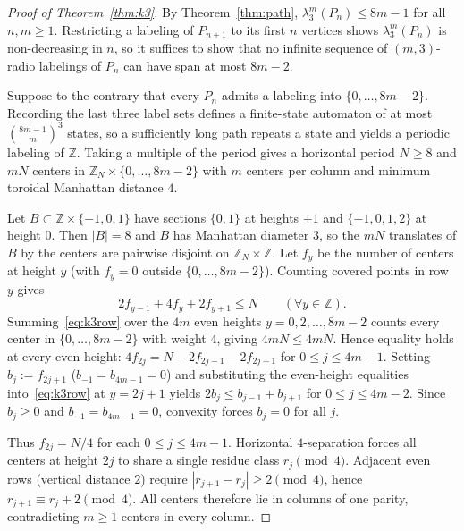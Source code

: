 \documentclass[11pt]{article}
\begin{document}
\begin{proof}[Proof of Theorem~\ref{thm:k3}]
By Theorem~\ref{thm:path}, $\lambda_3^m(P_n) \le 8m - 1$ for all $n, m \ge 1$. Restricting a labeling of $P_{n+1}$ to its first $n$ vertices shows $\lambda_3^m(P_n)$ is non-decreasing in $n$, so it suffices to show that no infinite sequence of $(m, 3)$-radio labelings of $P_n$ can have span at most $8m - 2$.

Suppose to the contrary that every $P_n$ admits a labeling into $\{0, \dots, 8m - 2\}$. Recording the last three label sets defines a finite-state automaton of at most $\binom{8m-1}{m}^3$ states, so a sufficiently long path repeats a state and yields a periodic labeling of $\mathbb{Z}$. Taking a multiple of the period gives a horizontal period $N \ge 8$ and $mN$ centers in $\mathbb{Z}_N \times \{0, \dots, 8m - 2\}$ with $m$ centers per column and minimum toroidal Manhattan distance $4$.

Let $B \subset \mathbb{Z} \times \{-1, 0, 1\}$ have sections $\{0, 1\}$ at heights $\pm 1$ and $\{-1, 0, 1, 2\}$ at height $0$. Then $|B| = 8$ and $B$ has Manhattan diameter $3$, so the $mN$ translates of $B$ by the centers are pairwise disjoint on $\mathbb{Z}_N \times \mathbb{Z}$. Let $f_y$ be the number of centers at height $y$ (with $f_y = 0$ outside $\{0, \dots, 8m - 2\}$). Counting covered points in row $y$ gives
\begin{equation}\label{eq:k3row}
2f_{y-1} + 4f_y + 2f_{y+1} \le N \qquad (\forall y \in \mathbb{Z}).
\end{equation}
Summing~\eqref{eq:k3row} over the $4m$ even heights $y = 0, 2, \dots, 8m - 2$ counts every center in $\{0, \dots, 8m - 2\}$ with weight $4$, giving $4mN \le 4mN$. Hence equality holds at every even height: $4f_{2j} = N - 2f_{2j-1} - 2f_{2j+1}$ for $0 \le j \le 4m - 1$. Setting $b_j := f_{2j+1}$ ($b_{-1} = b_{4m-1} = 0$) and substituting the even-height equalities into~\eqref{eq:k3row} at $y = 2j + 1$ yields $2b_j \le b_{j-1} + b_{j+1}$ for $0 \le j \le 4m - 2$. Since $b_j \ge 0$ and $b_{-1} = b_{4m-1} = 0$, convexity forces $b_j = 0$ for all $j$.

Thus $f_{2j} = N/4$ for each $0 \le j \le 4m - 1$. Horizontal $4$-separation forces all centers at height $2j$ to share a single residue class $r_j \pmod 4$. Adjacent even rows (vertical distance $2$) require $|r_{j+1} - r_j| \ge 2 \pmod 4$, hence $r_{j+1} \equiv r_j + 2 \pmod 4$. All centers therefore lie in columns of one parity, contradicting $m \ge 1$ centers in every column.
\end{proof}
\end{document}

